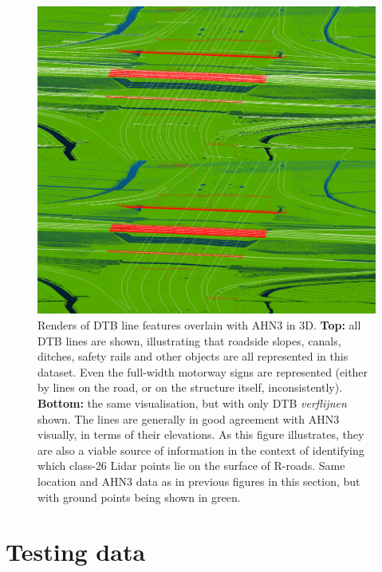 \begin{figure}
    \centering
    \includegraphics[width=\linewidth]{p2/figs/ahn_sample_10.png} 
    \caption{Renders of DTB line features overlain with AHN3 in 3D. \textbf{Top:} all DTB lines are shown, illustrating that roadside slopes, canals, ditches, safety rails and other objects are all represented in this dataset. Even the full-width motorway signs are represented (either by lines on the road, or on the structure itself, inconsistently). \textbf{Bottom:} the same visualisation, but with only DTB \textit{verflijnen} shown. The lines are generally in good agreement with AHN3 visually, in terms of their elevations. As this figure illustrates, they are also a viable source of information in the context of identifying which class-26 Lidar points lie on the surface of R-roads. Same location and AHN3 data as in previous figures in this section, but with ground points being shown in green.}
    \label{fig:dtbahn}
\end{figure}

\section*{Testing data}

